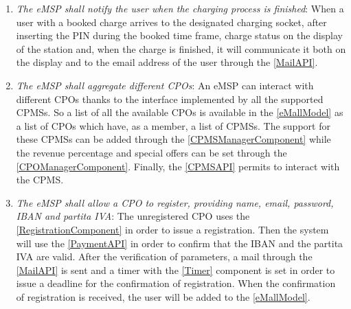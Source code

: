 \begin{enumerate}[label=\textbf{R\arabic*}]
    \label{req:eMSP-proactive-suggestions}
    \item \textit{The \ac{eMSP} shall notify the user when the charging process is finished}:
    When a user with a booked charge arrives to the designated charging socket, after inserting the PIN during the booked time frame, charge status on the display of the station and, when the charge is finished, it will communicate it both on the display and to the email address of the user through the \ref{MailAPI}.
    \label{req:eMSP-notification}
    \item \textit{The \ac{eMSP} shall aggregate different \acp{CPO}}:
    An \ac{eMSP} can interact with different \acp{CPO} thanks to the interface implemented by all the supported \acp{CPMS}. 
    So a list of all the available \acp{CPO} is available in the \ref{eMallModel} as a list of \acp{CPO} which have, as a member, a list of \acp{CPMS}. 
    The support for these \acp{CPMS} can be added through the \ref{CPMSManagerComponent} while the revenue percentage and special offers can be set through the \ref{CPOManagerComponent}. 
    Finally, the \ref{CPMSAPI} permits to interact with the \ac{CPMS}.
    \label{req:eMSP-compatible}
    \item \textit{The \ac{eMSP} shall allow a \ac{CPO} to register, providing name, email, password, \ac{IBAN} and \gls{partita IVA}}: 
    The unregistered \ac{CPO} uses the \ref{RegistrationComponent} in order to issue a registration. 
    Then the system will use the \ref{PaymentAPI} in order to confirm that the \ac{IBAN} and the \gls{partita IVA} are valid. 
    After the verification of parameters, a mail through the \ref{MailAPI} is sent and a timer with the \ref{Timer} component is set in order to issue a deadline for the confirmation of registration. 
    When the confirmation of registration is received, the user will be added to the \ref{eMallModel}.

\end{enumerate}
